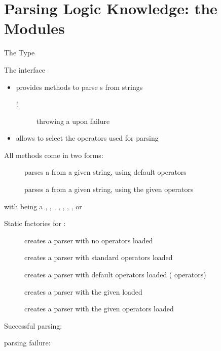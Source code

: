\documentclass[handout]{beamer}
\begin{document}
\section{Parsing Logic Knowledge: the  Modules}

\begin{frame}[allowframebreaks]{The  Type}

    \begin{block}{The  interface}
        \begin{itemize}
            \item provides methods to parse s from strings
            \begin{description}
                \item[!] throwing a  upon failure 
            \end{description}
            \item allows to select the operators used for parsing
        \end{itemize}
    \end{block}
    All methods come in two forms:
    \begin{description}
        \item[] parses a  from a given string, using default operators
        \item[] parses a  from a given string, using the given operators
    \end{description}
    with  being a , , , , , , ,  or 

    \framebreak

    Static factories for :
    \begin{description}
        \item [] creates a parser with no operators loaded
        \item [] creates a parser with standard operators loaded
        \item [] creates a parser with default operators loaded ( operators)
        \item [] creates a parser with the given  loaded
        \item [] creates a parser with the given operators loaded 
    \end{description}

    \framebreak

    Successful  parsing:

    \framebreak

     parsing failure:

\end{frame}
\end{document}
